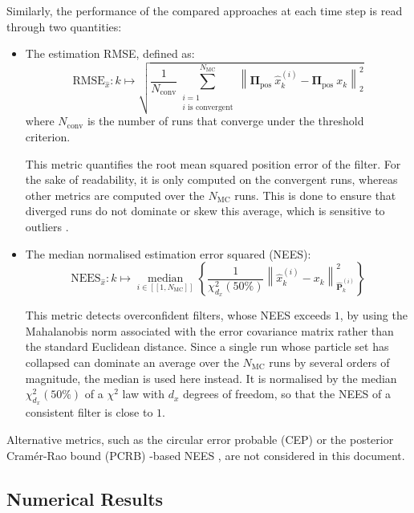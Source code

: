 Similarly, the performance of the compared approaches at each time step is read through two quantities:
\begin{itemize}
	\item The estimation RMSE, defined as:
	\begin{equation}
		\mathrm{RMSE}_{\hat{x}}:k\mapsto\sqrt{\frac{1}{N_{\mathrm{conv}}}\sum_{\substack{i=1\\i\text{ is convergent}}}^{N_\mathrm{MC}}\left\|\boldsymbol{\Pi}_{\mathrm{pos}}\:\hat{x}_k^{(i)}-\boldsymbol{\Pi}_{\mathrm{pos}}\:x_k\right\|_2^2}\label{eq:estimation_RMSE}
	\end{equation}
	where $N_{\mathrm{conv}}$ is the number of runs that converge under the threshold criterion.

	This metric quantifies the root mean squared position error of the filter. For the sake of readability, it is only computed on the convergent runs, whereas other metrics are computed over the $N_\mathrm{MC}$ runs. This is done to ensure that diverged runs do not dominate or skew this average, which is sensitive to outliers \cite{bib:estimation-evaluation}.
	\item The median normalised estimation error squared (NEES):
	\begin{equation}
		\mathrm{NEES}_{\hat{x}}:k\mapsto\underset{i\in[\![1,N_\mathrm{MC}]\!]}{\operatorname{median}}\left\{\frac{1}{\chi_{d_x}^2(50\%)}\left\|\hat{x}_k^{(i)}-x_k\right\|_{\hat{\mathbf{P}}_k^{(i)}}^2\right\}\label{eq:estimation_NEES}
	\end{equation}

	This metric detects overconfident filters, whose NEES exceeds $1$, by using the Mahalanobis norm associated with the error covariance matrix rather than the standard Euclidean distance. Since a single run whose particle set has collapsed can dominate an average over the $N_\mathrm{MC}$ runs by several orders of magnitude, the median is used here instead. It is normalised by the median $\chi_{d_x}^2(50\%)$ of a $\chi^2$ law with $d_x$ degrees of freedom, so that the NEES of a consistent filter is close to $1$.
\end{itemize}

Alternative metrics, such as the circular error probable (CEP) \cite{bib:CEP} or the posterior Cramér-Rao bound (PCRB) \cite{bib:PCRB}-based NEES \cite{bib:statistical-efficiency}, are not considered in this document.

\subsection{Numerical Results}

